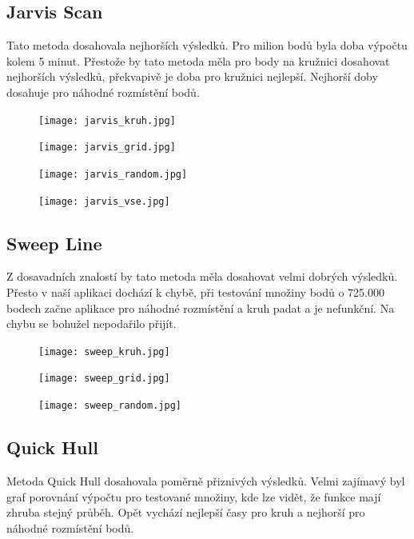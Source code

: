 \documentclass[a4paper, 12pt]{article}
\begin{document}
\subsection{Jarvis Scan}
Tato metoda dosahovala nejhorších výsledků. Pro milion bodů byla doba výpočtu kolem 5 minut. Přestože by tato metoda měla pro body na kružnici dosahovat nejhorších výsledků, překvapivě je doba pro kružnici nejlepší. Nejhorší doby dosahuje pro náhodné rozmístění bodů.





\begin{figure}[h!]
	\centering
	\texttt{[image: jarvis\_kruh.jpg]}
\end{figure}


\begin{figure}[h!]
	\centering
	\texttt{[image: jarvis\_grid.jpg]}
\end{figure}


\begin{figure}[h!]
	\centering
	\texttt{[image: jarvis\_random.jpg]}
\end{figure}


\begin{figure}[h!]
	\centering
	\texttt{[image: jarvis\_vse.jpg]}
\end{figure}

\clearpage


\subsection{Sweep Line}
Z dosavadních znalostí by tato metoda měla dosahovat velmi dobrých výsledků. Přesto v naší aplikaci dochází k chybě, při testování množiny bodů o 725.000 bodech začne aplikace pro náhodné rozmístění a kruh padat a je nefunkční. Na chybu se bohužel nepodařilo přijít.

\begin{figure}[h!]
	\centering
	\texttt{[image: sweep\_kruh.jpg]}
\end{figure}


\begin{figure}[h!]
	\centering
	\texttt{[image: sweep\_grid.jpg]}
\end{figure}


\begin{figure}[h!]
	\centering
	\texttt{[image: sweep\_random.jpg]}
\end{figure}
\clearpage

\subsection{Quick Hull}
Metoda Quick Hull dosahovala poměrně přiznivých výsledků. Velmi zajímavý byl graf porovnání výpočtu pro testované množiny, kde lze vidět, že funkce mají zhruba stejný průběh. Opět vychází nejlepší časy pro kruh a nejhorší pro náhodné rozmístění bodů.
\end{document}
